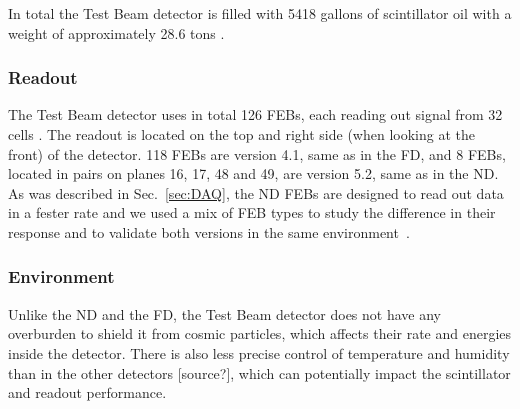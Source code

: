 In total the Test Beam detector is filled with 5418 gallons of scintillator oil with a weight of approximately 28.6 tons \cite{NOvA-doc-29543}.

\subsubsection*{Readout}
The Test Beam detector uses in total 126 \gls{FEB}s, each reading out signal from 32 cells \cite{NOvA-doc-29543}. The readout is located on the top and right side (when looking at the front) of the detector. 118 \gls{FEB}s are version 4.1, same as in the \gls{FD}, and 8 \gls{FEB}s, located in pairs on planes 16, 17, 48 and 49, are version 5.2, same as in the \gls{ND}. As was described in Sec.~\ref{sec:DAQ}, the \gls{ND} \gls{FEB}s are designed to read out data in a fester rate and we used a mix of \gls{FEB} types to study the difference in their response and to validate both versions in the same environment~\cite{LackeyThesisNOvATBProtons2022.pdf}.


\subsubsection*{Environment}
Unlike the \gls{ND} and the \gls{FD}, the Test Beam detector does not have any overburden to shield it from cosmic particles, which affects their rate and energies inside the detector. There is also less precise control of temperature and humidity than in the other detectors [source?], which can potentially impact the scintillator and readout performance.



